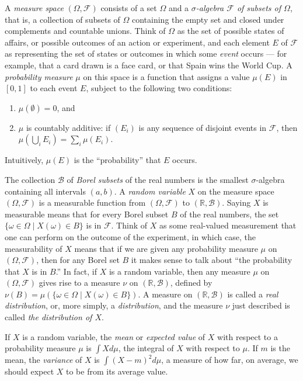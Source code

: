 \documentclass{svjour3}
\newcommand{\RR}{\mathbb{R}}
\newcommand{\mdl}[1]{{\mathcal #1}} %
\begin{document}
A \emph{measure space} $(\Omega, \mdl F)$ consists of a set $\Omega$ and a \emph{$\sigma$-algebra $\mdl F$ of subsets of $\Omega$}, that is, a collection of subsets of $\Omega$ containing the empty set and closed under complements and countable unions. Think of $\Omega$ as the set of possible states of affairs, or possible outcomes of an action or experiment, and each element $E$ of $\mdl F$ as representing the set of states or outcomes in which some \emph{event} occurs --- for example, that a card drawn is a face card, or that Spain wins the World Cup. A \emph{probability measure} $\mu$ on this space is a function that assigns a value $\mu(E)$ in $[0, 1]$ to each event $E$, subject to the following two conditions:
\begin{enumerate}
 \item $\mu(\emptyset) = 0$, and
 \item $\mu$ is countably additive: if $(E_i)$ is any sequence of disjoint events in $\mdl F$, then $\mu(\bigcup_i E_i) = \sum_i \mu(E_i)$.
\end{enumerate}
Intuitively, $\mu(E)$ is the ``probability'' that $E$ occurs. 

The collection $\mdl B$ of \emph{Borel subsets} of the real numbers is the smallest $\sigma$-algebra containing all intervals $(a, b)$. A \emph{random variable} $X$ on the measure space $(\Omega, \mdl F)$ is a measurable function from $(\Omega, \mdl F)$ to $(\RR, \mdl B)$. Saying $X$ is measurable means that for every Borel subset $B$ of the real numbers, the set $\{ \omega \in \Omega \; | \; X(\omega) \in B \}$ is in $\mdl F$. Think of $X$ as some real-valued measurement that one can perform on the outcome of the experiment, in which case, the measurability of $X$ means that if we are given any probability measure $\mu$ on $(\Omega, \mdl F)$, then for any Borel set $B$ it makes sense to talk about ``the probability that $X$ is in $B$.'' In fact, if $X$ is a random variable, then any measure $\mu$ on $(\Omega, \mdl F)$ gives rise to a measure $\nu$ on $(\RR, \mdl B)$, defined by $\nu(B) = \mu ( \{ \omega \in \Omega \; | \; X (\omega) \in B \})$. A measure on $(\RR, \mdl B)$ is called a \emph{real distribution}, or, more simply, a \emph{distribution}, and the measure $\nu$ just described is called \emph{the distribution of $X$}.

If $X$ is a random variable, the \emph{mean} or \emph{expected value} of $X$ with respect to a probability measure $\mu$ is $\int X d\mu$, the integral of $X$ with respect to $\mu$. If $m$ is the mean, the \emph{variance} of $X$ is $\int (X - m)^2 d\mu$, a measure of how far, on average, we should expect $X$ to be from its average value.
\end{document}
